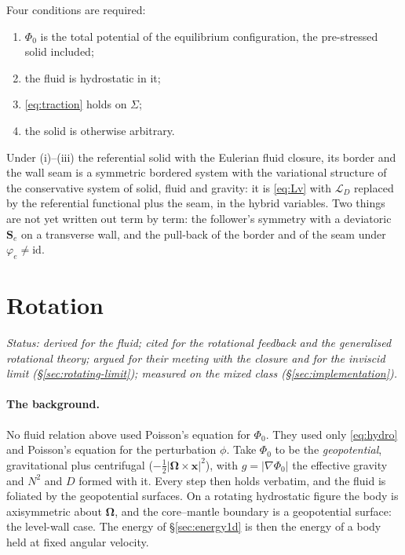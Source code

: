 \documentclass[11pt]{article}
\theoremstyle{definition}
\theoremstyle{remark}
\newcommand{\bx}{\mathbf{x}}
\newcommand{\bOmega}{\boldsymbol{\Omega}}
\newcommand{\Ltot}{\mathcal L}
\newcommand{\Se}{\mathbf{S}_e}
\begin{document}
Four conditions are required:
\begin{enumerate}
\item[(i)] $\Phi_0$ is the total potential of the equilibrium
  configuration, the pre-stressed solid included;
\item[(ii)] the fluid is hydrostatic in it;
\item[(iii)] \eqref{eq:traction} holds on $\Sigma$;
\item[(iv)] the solid is otherwise arbitrary.
\end{enumerate}
Under (i)--(iii) the referential solid with the Eulerian fluid closure,
its border and the wall seam is a symmetric bordered system with the
variational structure of the conservative system of solid, fluid and
gravity: it is \eqref{eq:Lv} with $\Ltot_D$ replaced by the
referential functional plus the seam, in the hybrid variables. Two things are not yet written out term by term: the
follower's symmetry with a deviatoric $\Se$ on a transverse wall, and
the pull-back of the border and of the seam under $\varphi_e \ne
\mathrm{id}$.

\section{Rotation}
\label{sec:rotation}

\emph{Status: derived for the fluid; cited for the rotational feedback
and the generalised rotational theory; argued for their meeting with
the closure and for the inviscid limit (\S\ref{sec:rotating-limit});
measured on the mixed class (\S\ref{sec:implementation}).}

\paragraph{The background.} No fluid relation above used Poisson's
equation for $\Phi_0$. They used only \eqref{eq:hydro} and Poisson's
equation for the perturbation $\phi$. Take $\Phi_0$ to be the
\emph{geopotential}, gravitational plus centrifugal
($-\tfrac12|\bOmega\times\bx|^2$), with $g = |\nabla\Phi_0|$ the
effective gravity and $N^2$ and $D$ formed with it. Every step then
holds verbatim, and the fluid is foliated by the geopotential surfaces.
On a rotating hydrostatic figure the body is axisymmetric about
$\bOmega$, and the core--mantle boundary is a geopotential surface:
the level-wall case. The energy of \S\ref{sec:energy1d} is then the
energy of a body held at fixed angular velocity.
\end{document}
